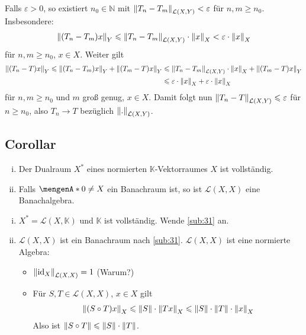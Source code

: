 \noindent Falls $\varepsilon >0$, so existiert $n_0 \in \mathds{N}$ mit $\norm[\mathcal{L}(X,Y)]{T_n - T_m}  < \varepsilon$ für $n,m \ge n_0$. Insbesondere: 
\begin{align*}
	\norm[Y]{(T_n- T_m)x} \le \norm[\mathcal{L}(X,Y)]{T_n -T_m} \cdot \norm[X]{x} < \varepsilon \cdot \norm[X]{x}    
\end{align*}
für $n,m \ge n_0$, $x \in X$. Weiter gilt 
\begin{align*}
	\norm[Y]{(T_n- T)x} \le \norm[Y]{(T_n - T_m)x} + \norm[Y]{(T_m-T)x} &\le \norm[\mathcal{L}(X,Y)]{T_n - T_m} \cdot \norm[X]{x} + \norm[Y]{(T_m-T)x} \\
	&\le \varepsilon \cdot \norm[X]{x} + \varepsilon \cdot \norm[X]{x}  
\end{align*}
für $n,m \ge n_0$ und $m$ groß genug, $x \in X$. Damit folgt nun
$\norm[\mathcal{L}(X,Y)]{T_n -T} \le \varepsilon$ für$n \ge n_0$, also $T_n \to T$ bezüglich $\norm[\mathcal{L}(X,Y)]{.}$. \bewende

\subsection[Corollar: Dualraum ist vollständig und $\mathcal{L}(X,X)$ ist Banachalgebra, falls $X$ Banachraum]{Corollar} %
\label{sub:32}
\begin{enumerate}[(i)]
	\item Der Dualraum $X^*$ eines normierten $\mathds{K}$-Vektorraumes $X$ ist vollständig. 
	\item Falls $\set{0} \not= X$ ein Banachraum ist, so ist $\mathcal{L}(X,X)$ eine Banachalgebra.
\end{enumerate}
\begin{enumerate}[(i)]
	\item $X^*=\mathcal{L}(X,\mathds{K})$ und $\mathds{K}$ ist vollständig. Wende \ref{sub:31} an.
	\item $\mathcal{L}(X,X)$ ist ein Banachraum nach \ref{sub:31}. $\mathcal{L}(X,X)$ ist eine normierte Algebra: 
	\begin{itemize}
		\item $\norm[\mathcal{L}(X,X)]{\id_X}=1$ \hfill (Warum?)
		\item Für $S,T \in \mathcal{L}(X,X)$, $x \in X$ gilt
		\begin{align*}
			\norm[X]{(S \circ T)x} \le \norm{S} \cdot \norm[X]{T x} \le \norm{S} \cdot \norm{T} \cdot \norm[X]{x}   
		\end{align*}
		Also ist $\norm{S \circ T} \le \norm{S} \cdot \norm{T}$. \bewende
	\end{itemize}
\end{enumerate}


